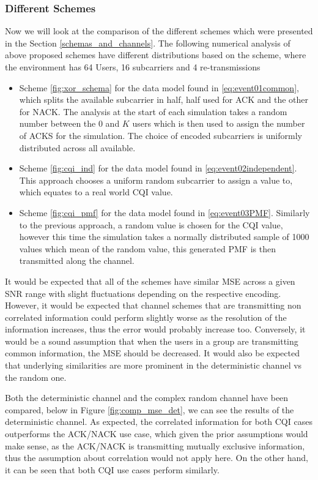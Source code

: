 \documentclass{article}
\begin{document}
\subsubsection{Different Schemes}
Now we will look at the comparison of the different schemes which were presented in the Section \ref{schemas_and_channels}. The following numerical analysis of above proposed schemes have different distributions based on the scheme, where the environment has 64 Users, 16 subcarriers and 4 re-transmissions
\begin{itemize}
    \item Scheme \ref{fig:xor_schema} for the data model found in \ref{eq:event01common}, which splits the available subcarrier in half, half used for ACK and the other for NACK. The analysis at the start of each simulation takes a random number between the 0 and $K$ users which is then used to assign the number of ACKS for the simulation. The choice of encoded subcarriers is uniformly distributed across all available.
    \item Scheme \ref{fig:cqi_ind} for the data model found in \ref{eq:event02independent}. This approach chooses a uniform random subcarrier to assign a value to, which equates to a real world CQI value. 
    \item Scheme \ref{fig:cqi_pmf} for the data model found in \ref{eq:event03PMF}. Similarly to the previous approach, a random value is chosen for the CQI value, however this time the simulation takes a normally distributed sample of 1000 values which mean of the random value, this generated PMF is then transmitted along the channel. 
\end{itemize}

It would be expected that all of the schemes have similar MSE across a given SNR range with slight fluctuations depending on the respective encoding. However, it would be expected that channel schemes that are transmitting non correlated information could perform slightly worse as the resolution of the information increases, thus the error would probably increase too. Conversely, it would be a sound assumption that when the users in a group are transmitting common information, the MSE should be decreased. It would also be expected that underlying similarities are more prominent in the deterministic channel vs the random one. 


Both the deterministic channel and the complex random channel have been compared, below in Figure \ref{fig:comp_mse_det}, we can see the results of the deterministic channel. As expected, the correlated information for  both CQI cases outperforms the ACK/NACK use case, which given the prior assumptions would make sense, as the ACK/NACK is transmitting mutually exclusive information, thus the assumption about correlation would not apply here. On the other hand, it can be seen that both CQI use cases perform similarly.
\end{document}
